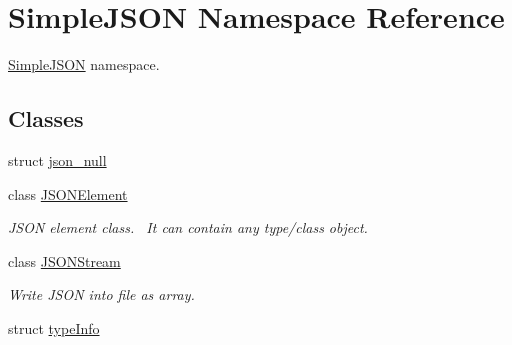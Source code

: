 \hypertarget{namespace_simple_j_s_o_n}{\section{Simple\+J\+S\+O\+N Namespace Reference}
\label{namespace_simple_j_s_o_n}
}


\hyperlink{namespace_simple_j_s_o_n}{Simple\+J\+S\+O\+N} namespace.  


\subsection*{Classes}
\begin{DoxyCompactItemize}
\item 
struct \hyperlink{struct_simple_j_s_o_n_1_1json__null}{json\+\_\+null}
\item 
class \hyperlink{class_simple_j_s_o_n_1_1_j_s_o_n_element}{J\+S\+O\+N\+Element}
\begin{DoxyCompactList}\small\item\em J\+S\+O\+N element class.~\newline
 It can contain any type/class object. \end{DoxyCompactList}\item 
class \hyperlink{class_simple_j_s_o_n_1_1_j_s_o_n_stream}{J\+S\+O\+N\+Stream}
\begin{DoxyCompactList}\small\item\em Write J\+S\+O\+N into file as array. \end{DoxyCompactList}\item 
struct \hyperlink{struct_simple_j_s_o_n_1_1type_info}{type\+Info}
\end{DoxyCompactItemize}
